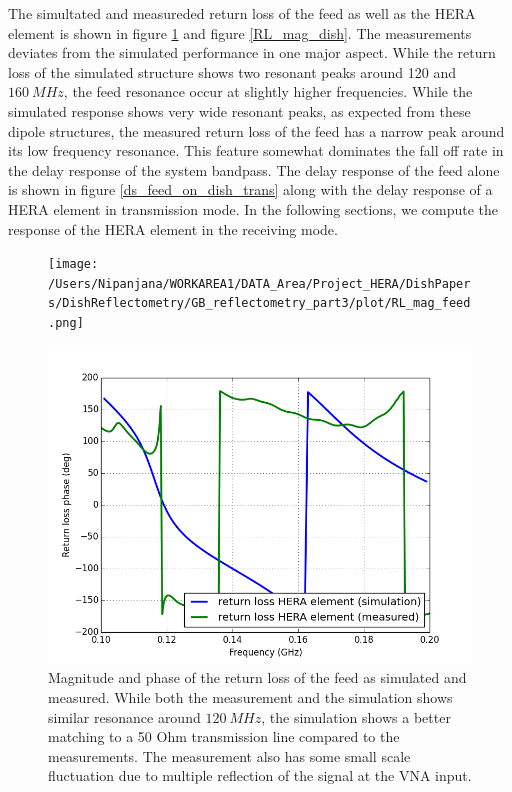 \documentclass[twocolumn]{emulateapj}
\begin{document}
The simultated and measureded return loss of the feed as well as the HERA element is shown in figure \ref{RL_mag_feed} and figure \ref{RL_mag_dish}. The measurements deviates from the simulated performance in one major aspect. While the return loss of the simulated structure shows two resonant peaks around 120 and $160~MHz$, the feed resonance occur at slightly higher frequencies. While the simulated response shows very wide resonant peaks, as expected from these dipole structures, the measured return loss of the feed has a narrow peak around its low frequency resonance. This feature somewhat dominates the fall off rate in the delay response of the system bandpass. The delay response of the feed alone is shown in figure \ref{ds_feed_on_dish_trans} along with the delay response of a HERA element in transmission mode. In the following sections, we compute the response of the HERA element in the receiving mode. 
\begin{figure}[ht]
\begin{minipage}[b]{\linewidth}
\centering
\texttt{[image: /Users/Nipanjana/WORKAREA1/DATA\_Area/Project\_HERA/DishPapers/DishReflectometry/GB\_reflectometry\_part3/plot/RL\_mag\_feed.png]}
\end{minipage}
\vspace{0.1cm}
\begin{minipage}[b]{\linewidth}
\centering
\includegraphics[angle=0, width=\linewidth]{plots/feed_meas_sim_ph.png}
\end{minipage}
\caption{Magnitude and phase of the return loss of the feed as simulated and measured. While both the measurement and the simulation shows similar resonance around $120~MHz$, the simulation shows a better matching to a 50 Ohm transmission line compared to the measurements. The measurement also has some small scale fluctuation due to multiple reflection of the signal at the VNA input. }   
\label{RL_mag_feed}
\end{figure}
\end{document}
